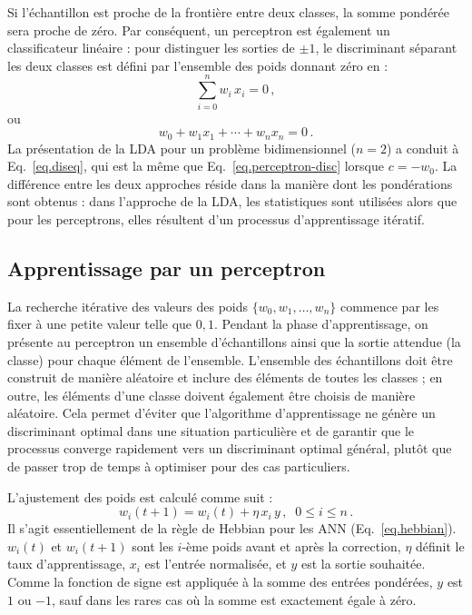 Si l'échantillon est proche de la frontière entre deux classes, la somme pondérée sera proche de zéro. Par conséquent, un perceptron est également un classificateur linéaire : pour distinguer les sorties de $\pm 1$, le discriminant séparant les deux classes est défini par l'ensemble des poids donnant zéro en :
\[
\sum_{i=0}^{n} w_i\,x_i=0\,,
\]
ou
\begin{equation}
w_0 + w_1x_1 + \cdots + w_nx_n = 0\,.\label{eq.perceptron-disc}
\end{equation}
La présentation de la LDA pour un problème bidimensionnel ($n=2$) a conduit à Eq.~\ref{eq.diseq}, qui est la même que Eq.~\ref{eq.perceptron-disc} lorsque $c=-w_0$. La différence entre les deux approches réside dans la manière dont les pondérations sont obtenus : dans l'approche de la LDA, les statistiques sont utilisées alors que pour les perceptrons, elles résultent d'un processus d'apprentissage itératif.

\subsection{Apprentissage par un perceptron}

La recherche itérative des valeurs des poids $\{w_0,w_1,\ldots,w_n\}$ commence par les fixer à une petite valeur telle que $0,1$. Pendant la phase d'apprentissage, on présente au perceptron un ensemble d'échantillons ainsi que la sortie attendue (la classe) pour chaque élément de l'ensemble. L'ensemble des échantillons doit être construit de manière aléatoire et inclure des éléments de toutes les classes ; en outre, les éléments d'une classe doivent également être choisis de manière aléatoire. Cela permet d'éviter que l'algorithme d'apprentissage ne génère un discriminant optimal dans une situation particulière  et de garantir que le processus converge rapidement vers un discriminant optimal général, plutôt que de passer trop de temps à optimiser pour des cas particuliers.

L'ajustement des poids est calculé comme suit :
\begin{equation}
w_i(t+1) = w_i(t) + \eta \,x_i \,y\,,\;\;0\leq i \leq n\,.\label{eq.perceptron-learn}
\end{equation}
Il s'agit essentiellement de la règle de Hebbian pour les ANN (Eq.~\ref{eq.hebbian}). $w_i(t)$ et $w_i(t+1)$ sont les $i$-ème poids avant et après la correction, $\eta$ définit le taux d'apprentissage, $x_i$ est l'entrée normalisée, et $y$ est la sortie souhaitée. Comme la fonction de signe est appliquée à la somme des entrées pondérées, $y$ est $1$ ou $-1$, sauf dans les rares cas où la somme est exactement égale à zéro. 

